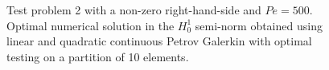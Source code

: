 \begin{figure}
	\centering
	\caption{Test problem 2 with a non-zero right-hand-side and $Pe=500$. Optimal numerical solution in the $H^1_0$ semi-norm obtained using linear and quadratic continuous Petrov Galerkin with optimal testing  on a partition of 10 elements.}
	\label{fig:optimaltestfunc5}
\end{figure}





















